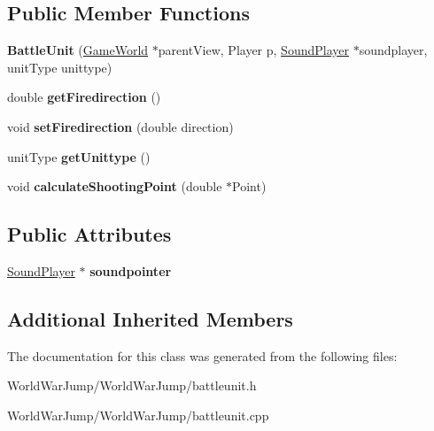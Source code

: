 \subsection*{Public Member Functions}
\begin{DoxyCompactItemize}
\item 
{\bfseries Battle\+Unit} (\hyperlink{class_game_world}{Game\+World} $\ast$parent\+View, Player p, \hyperlink{class_sound_player}{Sound\+Player} $\ast$soundplayer, unit\+Type unittype)\hypertarget{class_battle_unit_a45f1f2b4b1104e2efeb6a25f285f7932}{}\label{class_battle_unit_a45f1f2b4b1104e2efeb6a25f285f7932}

\item 
double {\bfseries get\+Firedirection} ()\hypertarget{class_battle_unit_aa5a7ea370e2f789b51f5617b45822bdb}{}\label{class_battle_unit_aa5a7ea370e2f789b51f5617b45822bdb}

\item 
void {\bfseries set\+Firedirection} (double direction)\hypertarget{class_battle_unit_ab038bbc9e82cea88af5a9228c0559463}{}\label{class_battle_unit_ab038bbc9e82cea88af5a9228c0559463}

\item 
unit\+Type {\bfseries get\+Unittype} ()\hypertarget{class_battle_unit_a26e22880479bf89c7cc3cec7c8f84a0b}{}\label{class_battle_unit_a26e22880479bf89c7cc3cec7c8f84a0b}

\item 
void {\bfseries calculate\+Shooting\+Point} (double $\ast$Point)\hypertarget{class_battle_unit_a065ad7ba4c947aafd266b7a9e4c523a4}{}\label{class_battle_unit_a065ad7ba4c947aafd266b7a9e4c523a4}

\end{DoxyCompactItemize}
\subsection*{Public Attributes}
\begin{DoxyCompactItemize}
\item 
\hyperlink{class_sound_player}{Sound\+Player} $\ast$ {\bfseries soundpointer}\hypertarget{class_battle_unit_ac450e1e80608c8031e27406bc0be5a90}{}\label{class_battle_unit_ac450e1e80608c8031e27406bc0be5a90}

\end{DoxyCompactItemize}
\subsection*{Additional Inherited Members}


The documentation for this class was generated from the following files\+:\begin{DoxyCompactItemize}
\item 
World\+War\+Jump/\+World\+War\+Jump/battleunit.\+h\item 
World\+War\+Jump/\+World\+War\+Jump/battleunit.\+cpp\end{DoxyCompactItemize}

